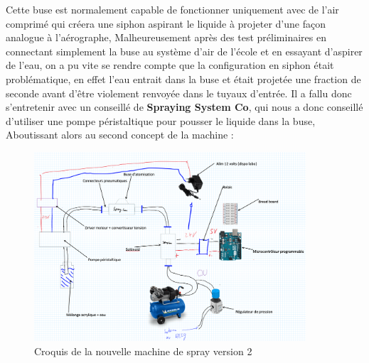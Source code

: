 Cette buse est normalement capable de fonctionner uniquement avec de l'air comprimé qui créera une siphon aspirant le liquide à projeter d'une façon analogue à l'aérographe,
Malheureusement après des test préliminaires en connectant simplement la buse au système d'air de l'école et en essayant d'aspirer de l'eau, on a pu vite se rendre compte que la
configuration en siphon était problématique, en effet l'eau entrait dans la buse et était projetée une fraction de seconde avant d'être violement renvoyée dans le tuyaux d'entrée.
Il a fallu donc s'entretenir avec un conseillé de \textbf{Spraying System Co}, qui nous a donc conseillé d'utiliser une pompe péristaltique pour pousser le liquide dans la buse,
Aboutissant alors au second concept de la machine :
\begin{figure}[H]
    \centering
    \includegraphics[width = 0.9\textwidth]{assets/figures/ameliorations/Croquis_machine_ecran_ver_2.png}
    \caption[Croquis nouvelle machine de spray ver. 2]{Croquis de la nouvelle machine de spray version 2}
\end{figure}


